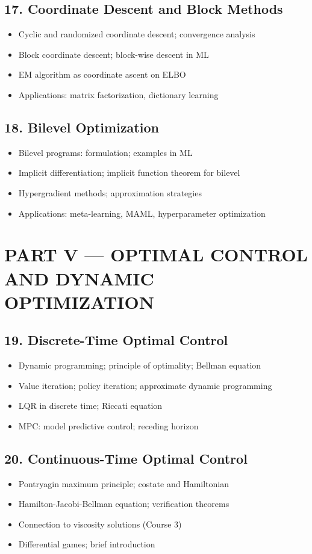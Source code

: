 \subsection{17. Coordinate Descent and Block Methods}
\begin{itemize}
\item Cyclic and randomized coordinate descent; convergence analysis
\item Block coordinate descent; block-wise descent in ML
\item EM algorithm as coordinate ascent on ELBO
\item Applications: matrix factorization, dictionary learning
\end{itemize}

\subsection{18. Bilevel Optimization}
\begin{itemize}
\item Bilevel programs: formulation; examples in ML
\item Implicit differentiation; implicit function theorem for bilevel
\item Hypergradient methods; approximation strategies
\item Applications: meta-learning, MAML, hyperparameter optimization
\end{itemize}

\section{PART V --- OPTIMAL CONTROL AND DYNAMIC OPTIMIZATION}

\subsection{19. Discrete-Time Optimal Control}
\begin{itemize}
\item Dynamic programming; principle of optimality; Bellman equation
\item Value iteration; policy iteration; approximate dynamic programming
\item LQR in discrete time; Riccati equation
\item MPC: model predictive control; receding horizon
\end{itemize}

\subsection{20. Continuous-Time Optimal Control}
\begin{itemize}
\item Pontryagin maximum principle; costate and Hamiltonian
\item Hamilton-Jacobi-Bellman equation; verification theorems
\item Connection to viscosity solutions (Course 3)
\item Differential games; brief introduction
\end{itemize}

